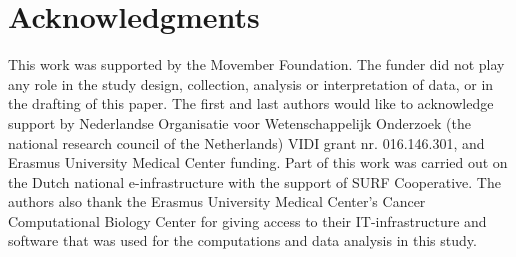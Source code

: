 \section*{Acknowledgments}
This work was supported by the Movember Foundation. The funder did not play any role in the study design, collection, analysis or interpretation of data, or in the drafting of this paper. The first and last authors would like to acknowledge support by Nederlandse Organisatie voor Wetenschappelijk Onderzoek (the national research council of the Netherlands) VIDI grant nr. 016.146.301, and Erasmus University Medical Center funding. Part of this work was carried out on the Dutch national e-infrastructure with the support of SURF Cooperative. The authors also thank the Erasmus University Medical Center's Cancer Computational Biology Center for giving access to their IT-infrastructure and software that was used for the computations and data analysis in this study.